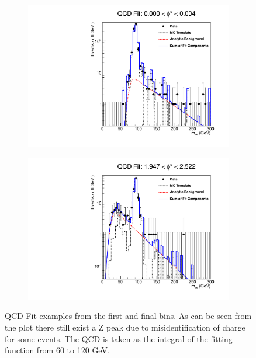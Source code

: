 \begin{figure}[!p]
    \centering
    \begin{subfigure}[b]{0.49\textwidth}
     \includegraphics[width=\linewidth]{figures/DataSets/qcd_fit_plot_for_01.pdf}
     \caption{}
    \end{subfigure}
    \begin{subfigure}[b]{0.49\textwidth}
     \includegraphics[width=\linewidth]{figures/DataSets/qcd_fit_plot_for_33.pdf}
     \caption{}
    \end{subfigure}
    \caption[QCD Fit examples]{QCD Fit examples from the first and final \phistar bins. As can be seen from the plot there still exist a Z peak due to misidentification of charge for some \Ztoee events. The QCD is taken as the integral of the fitting function from 60 to 120 GeV.}
    \label{fig:QCDExampleCalc}
\end{figure}

